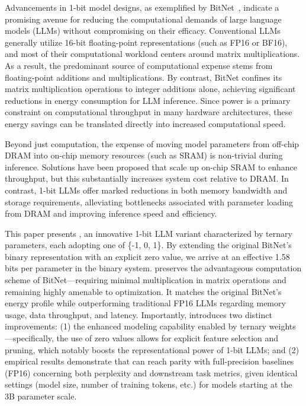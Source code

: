 Advancements in 1-bit model designs, as exemplified by BitNet~\cite{bitnet}, indicate a promising avenue for reducing the computational demands of large language models (LLMs) without compromising on their efficacy. Conventional LLMs generally utilize 16-bit floating-point representations (such as FP16 or BF16), and most of their computational workload centers around matrix multiplications. As a result, the predominant source of computational expense stems from floating-point additions and multiplications. By contrast, BitNet confines its matrix multiplication operations to integer additions alone, achieving significant reductions in energy consumption for LLM inference. Since power is a primary constraint on computational throughput in many hardware architectures, these energy savings can be translated directly into increased computational speed.

Beyond just computation, the expense of moving model parameters from off-chip DRAM into on-chip memory resources (such as SRAM) is non-trivial during inference. Solutions have been proposed that scale up on-chip SRAM to enhance throughput, but this substantially increases system cost relative to DRAM. In contrast, 1-bit LLMs offer marked reductions in both memory bandwidth and storage requirements, alleviating bottlenecks associated with parameter loading from DRAM and improving inference speed and efficiency.

This paper presents \textbf{}, an innovative 1-bit LLM variant characterized by ternary parameters, each adopting one of \{-1, 0, 1\}. By extending the original BitNet’s binary representation with an explicit zero value, we arrive at an effective 1.58 bits per parameter in the binary system.  preserves the advantageous computation scheme of BitNet—requiring minimal multiplication in matrix operations and remaining highly amenable to optimization. It matches the original BitNet’s energy profile while outperforming traditional FP16 LLMs regarding memory usage, data throughput, and latency. Importantly,  introduces two distinct improvements: (1) the enhanced modeling capability enabled by ternary weights—specifically, the use of zero values allows for explicit feature selection and pruning, which notably boosts the representational power of 1-bit LLMs; and (2) empirical results demonstrate that  can reach parity with full-precision baselines (FP16) concerning both perplexity and downstream task metrics, given identical settings (model size, number of training tokens, etc.) for models starting at the 3B parameter scale.

